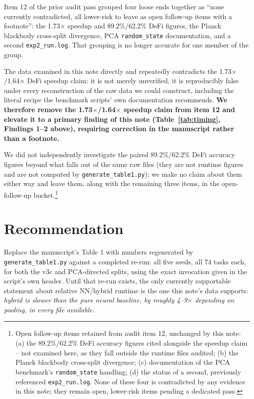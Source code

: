 \documentclass{jmlr}
\begin{document}
Item 12 of the prior audit pass grouped four loose ends together as
``none currently contradicted, all lower-risk to leave as open follow-up
items with a footnote'': the 1.73$\times$ speedup and 89.2\%/62.2\% DeFi
figures, the Planck blackbody cross-split divergence, PCA
\texttt{random\_state} documentation, and a second \texttt{exp2\_run.log}.
That grouping is no longer accurate for one member of the group.

The data examined in this note directly and repeatedly contradicts the
1.73$\times$/1.64$\times$ DeFi speedup claim: it is not merely
unverified, it is reproducibly false under every reconstruction of the raw
data we could construct, including the literal recipe the benchmark
scripts' own documentation recommends. \textbf{We therefore remove the
1.73$\times$/1.64$\times$ speedup claim from item 12 and elevate it to a
primary finding of this note (Table~\ref{tab:timing}, Findings 1--2
above), requiring correction in the manuscript rather than a footnote.}

We did not independently investigate the paired 89.2\%/62.2\% DeFi accuracy
figures beyond what falls out of the same raw files (they are not runtime
figures and are not computed by \texttt{generate\_table1.py}); we make no
claim about them either way and leave them, along with the remaining three
items, in the open-follow-up bucket.\footnote{Open follow-up items
retained from audit item 12, unchanged by this note: (a) the
89.2\%/62.2\% DeFi accuracy figures cited alongside the speedup claim --
not examined here, as they fall outside the runtime files audited; (b) the
Planck blackbody cross-split divergence; (c) documentation of the PCA
benchmark's \texttt{random\_state} handling; (d) the status of a second,
previously referenced \texttt{exp2\_run.log}. None of these four is
contradicted by any evidence in this note; they remain open, lower-risk
items pending a dedicated pass.}

\section{Recommendation}

Replace the manuscript's Table 1 with numbers regenerated by
\texttt{generate\_table1.py} against a completed re-run: all five seeds,
all 74 tasks each, for both the v3c and PCA-directed splits, using the
exact invocation given in the script's own header. Until that re-run
exists, the only currently supportable statement about relative NN/hybrid
runtime is the one this note's data supports: \emph{hybrid is slower than
the pure neural baseline, by roughly 4--9$\times$ depending on pooling,
in every file available.}
\end{document}
